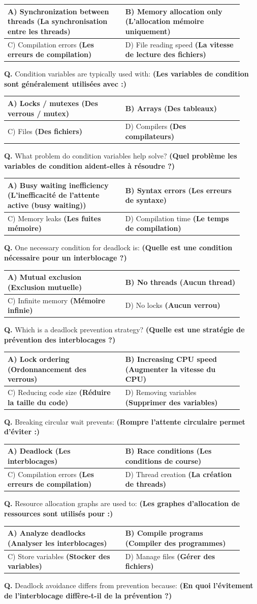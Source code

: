 \documentclass[11pt,a4paper]{article}
\newcounter{qnum}
\newcommand{\Q}{%
	\stepcounter{qnum}%
	\noindent\textbf{Q\theqnum. }%
}
\newcommand{\choices}[4]{%
	\setlength{\tabcolsep}{4pt}%
	\renewcommand{\arraystretch}{1.15}%
	\begin{tabular}{|p{0.46\linewidth}|p{0.46\linewidth}|}
		\hline
		A) #1 & B) #2 \\ \hline
		C) #3 & D) #4 \\ \hline
	\end{tabular}%
}
\begin{document}
	\choices
	{Synchronization between threads \textbf{(La synchronisation entre les threads)}}
	{Memory allocation only \textbf{(L’allocation mémoire uniquement)}}
	{Compilation errors \textbf{(Les erreurs de compilation)}}
	{File reading speed \textbf{(La vitesse de lecture des fichiers)}}
	
	\Q Condition variables are typically used with: \textbf{(Les variables de condition sont généralement utilisées avec :) }
	
	\choices
	{Locks / mutexes \textbf{(Des verrous / mutex)}}
	{Arrays \textbf{(Des tableaux)}}
	{Files \textbf{(Des fichiers)}}
	{Compilers \textbf{(Des compilateurs)}}
	
	\Q What problem do condition variables help solve? \textbf{(Quel problème les variables de condition aident-elles à résoudre ?) }
	
	\choices
	{Busy waiting inefficiency \textbf{(L’inefficacité de l’attente active (busy waiting))}}
	{Syntax errors \textbf{(Les erreurs de syntaxe)}}
	{Memory leaks \textbf{(Les fuites mémoire)}}
	{Compilation time \textbf{(Le temps de compilation)}}
	
	\Q One necessary condition for deadlock is: \textbf{(Quelle est une condition nécessaire pour un interblocage ?) }
	
	\choices
	{Mutual exclusion \textbf{(Exclusion mutuelle)}}
	{No threads \textbf{(Aucun thread)}}
	{Infinite memory \textbf{(Mémoire infinie)}}
	{No locks \textbf{(Aucun verrou)}}
	
	\Q Which is a deadlock prevention strategy? \textbf{(Quelle est une stratégie de prévention des interblocages ?) }
	
	\choices
	{Lock ordering \textbf{(Ordonnancement des verrous)}}
	{Increasing CPU speed \textbf{(Augmenter la vitesse du CPU)}}
	{Reducing code size \textbf{(Réduire la taille du code)}}
	{Removing variables \textbf{(Supprimer des variables)}}
	
	\Q Breaking circular wait prevents: \textbf{(Rompre l’attente circulaire permet d’éviter :) }
	
	\choices
	{Deadlock \textbf{(Les interblocages)}}
	{Race conditions \textbf{(Les conditions de course)}}
	{Compilation errors \textbf{(Les erreurs de compilation)}}
	{Thread creation \textbf{(La création de threads)}}
	
	\Q Resource allocation graphs are used to: \textbf{(Les graphes d’allocation de ressources sont utilisés pour :) }
	
	\choices
	{Analyze deadlocks \textbf{(Analyser les interblocages)}}
	{Compile programs \textbf{(Compiler des programmes)}}
	{Store variables \textbf{(Stocker des variables)}}
	{Manage files \textbf{(Gérer des fichiers)}}
\Q Deadlock avoidance differs from prevention because: \textbf{(En quoi l’évitement de l’interblocage diffère-t-il de la prévention ?) }
\end{document}
